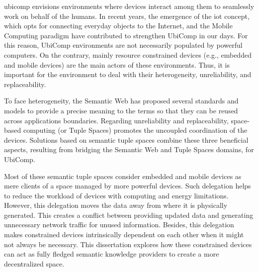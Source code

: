 




\begin{abstracts}        %
\acf{ubicomp} envisions environments where devices interact among them to seamlessly work on behalf of the humans.
In recent years, the emergence of the \acf{iot} concept, which opts for connecting everyday objects to the Internet, and the Mobile Computing paradigm have contributed to strengthen UbiComp in our days.
For this reason, UbiComp environments are not necessarily populated by powerful computers.
On the contrary, mainly resource constrained devices (e.g., embedded and mobile devices) are the main actors of these environments.
Thus, it is important for the environment to deal with their heterogeneity, unreliability, and replaceability.


To face heterogeneity, the Semantic Web has proposed several standards and models to provide a precise meaning to the terms so that they can be reused across applications boundaries.
Regarding unreliability and replaceability, space-based computing (or Tuple Spaces) promotes the uncoupled coordination of the devices.
Solutions based on semantic tuple spaces combine these three beneficial aspects, resulting from bridging the Semantic Web and Tuple Spaces domains, for UbiComp.

Most of these semantic tuple spaces consider embedded and mobile devices as mere clients of a space managed by more powerful devices.
Such delegation helps to reduce the workload of devices with computing and energy limitations.
However,  this delegation moves the data away from where it is physically generated.
This creates a conflict between providing updated data and generating unnecessary network traffic for unused information.
Besides, this delegation makes constrained devices intrinsically dependent on each other when it might not always be necessary.
This dissertation explores how these constrained devices can act as fully fledged semantic knowledge providers to create a more decentralized space.


\end{abstracts}
